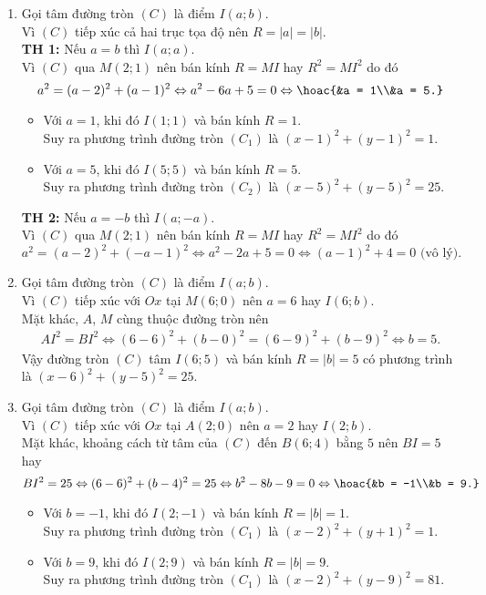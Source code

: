 \begin{bt}
{\begin{enumerate}
			\item Gọi tâm đường tròn $(C)$ là điểm $I(a;b)$.\\
			Vì $(C)$ tiếp xúc cả hai trục tọa độ nên $R = |a| = |b|$.\\
			\textbf{TH 1:} Nếu $a = b$ thì $I(a;a)$.\\
			Vì $(C)$ qua $M(2;1)$ nên bán kính $R = MI$ hay $R^2 = MI^2$ do đó
			$$ a^2 = (a - 2)^2 + (a - 1)^2 \Leftrightarrow a^2 - 6a + 5 = 0 \Leftrightarrow \hoac{&a = 1\\&a = 5.}$$
			\begin{itemize}
				\item Với $a = 1$, khi đó $I(1;1)$ và bán kính $R = 1$.\\
				Suy ra phương trình đường tròn $(C_1)$ là $(x - 1)^2 + (y - 1)^2 = 1$.
				\item Với $a = 5$, khi đó $I(5;5)$ và bán kính $R = 5$.\\
				Suy ra phương trình đường tròn $(C_2)$ là $(x - 5)^2 + (y - 5)^2 = 25$.
			\end{itemize}
			\textbf{TH 2:} Nếu $a = -b$ thì $I(a;-a)$.\\
			Vì $(C)$ qua $M(2;1)$ nên bán kính $R = MI$ hay $R^2 = MI^2$ do đó
			$$ a^2 = (a - 2)^2 + (-a - 1)^2 \Leftrightarrow a^2 - 2a + 5 = 0 \Leftrightarrow (a - 1)^2 + 4 = 0 \textrm{ (vô lý).} $$
			\item Gọi tâm đường tròn $(C)$ là điểm $I(a;b)$.\\
			Vì $(C)$ tiếp xúc với $Ox$ tại $M(6;0)$ nên $a = 6$ hay $I(6;b)$.\\
			Mặt khác, $A$, $M$ cùng thuộc đường tròn nên 
			\begin{eqnarray*}
				AI^2 = BI^2 \Leftrightarrow (6-6)^2 + (b-0)^2 = (6-9)^2 + (b-9)^2 \Leftrightarrow b = 5.
			\end{eqnarray*}
			Vậy đường tròn $(C)$ tâm $I(6;5)$ và bán kính $R = |b| = 5$ có phương trình là $(x - 6)^2 + (y - 5)^2 = 25$.
			\item Gọi tâm đường tròn $(C)$ là điểm $I(a;b)$.\\
			Vì $(C)$ tiếp xúc với $Ox$ tại $A(2;0)$ nên $a = 2$ hay $I(2;b)$.\\
			Mặt khác, khoảng cách từ tâm của $(C)$ đến $B(6;4)$ bằng $5$ nên $BI = 5$ hay
			$$ BI^2 = 25 \Leftrightarrow (6 - 6)^2 + (b - 4)^2 = 25 \Leftrightarrow b^2 - 8b - 9 = 0 \Leftrightarrow \hoac{&b = -1\\&b = 9.} $$
			\begin{itemize}
				\item Với $b = -1$, khi đó $I(2;-1)$ và bán kính $R = |b| = 1$.\\
				Suy ra phương trình đường tròn $(C_1)$ là $(x - 2)^2 + (y + 1)^2 = 1$.
				\item Với $b = 9$, khi đó $I(2;9)$ và bán kính $R = |b| = 9$.\\
				Suy ra phương trình đường tròn $(C_1)$ là $(x - 2)^2 + (y - 9)^2 = 81$.
			\end{itemize}
		\end{enumerate}
	}
\end{bt}

